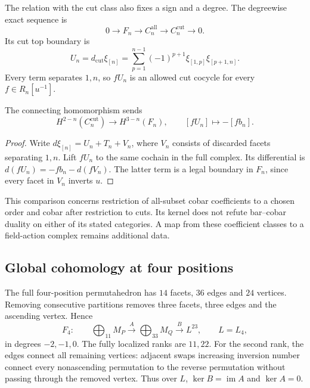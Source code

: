 The relation with the cut class also fixes a sign and a degree.
The degreewise exact sequence is
\[
 0\longrightarrow F_n\longrightarrow C_n^{\mathrm{all}}
                  \longrightarrow C_n^{\mathrm{cut}}\longrightarrow0.
\]
Its cut top boundary is
\[
 U_n=d_{\mathrm{cut}}\xi_{[n]}
    =\sum_{p=1}^{n-1}(-1)^{p+1}\xi_{[1,p]}\xi_{[p+1,n]}.
\]
Every term separates $1,n$, so $fU_n$ is an allowed cut
cocycle for every $f\in R_n[u^{-1}]$.

\begin{proposition}\label{prop:vol2-outer-connecting}
The connecting homomorphism sends
\[
 H^{2-n}(C_n^{\mathrm{cut}})\longrightarrow H^{3-n}(F_n),
 \qquad [fU_n]\longmapsto-[fb_n].
\]
\end{proposition}

\begin{proof}
Write $d\xi_{[n]}=U_n+T_n+V_n$, where $V_n$ consists of
discarded facets separating $1,n$. Lift $fU_n$ to the same
cochain in the full complex. Its differential is
$d(fU_n)=-fb_n-d(fV_n)$. The latter term is a legal boundary
in $F_n$, since every facet in $V_n$ inverts $u$.
\end{proof}

This comparison concerns restriction of all-subset cobar
coefficients to a chosen order and cobar after restriction to
cuts. Its kernel does not refute bar--cobar duality on either
of its stated categories. A map from these coefficient classes
to a field-action complex remains additional data.

\subsection{Global cohomology at four positions}

The full four-position permutahedron has $14$ facets, $36$
edges and $24$ vertices. Removing consecutive partitions removes
three facets, three edges and the ascending vertex. Hence
\begin{equation}\label{eq:vol2-four-discarded-matrices}
 F_4:\qquad \bigoplus_{11}M_P\xrightarrow{A}
                 \bigoplus_{33}M_Q\xrightarrow{B}L^{23},
 \qquad L=L_4,
\end{equation}
in degrees $-2,-1,0$. The fully localized ranks are $11,22$.
For the second rank, the edges connect all remaining vertices:
adjacent swaps increasing inversion number connect every
nonascending permutation to the reverse permutation without
passing through the removed vertex. Thus over $L$,
$\ker B=\operatorname{im}A$ and $\ker A=0$.

